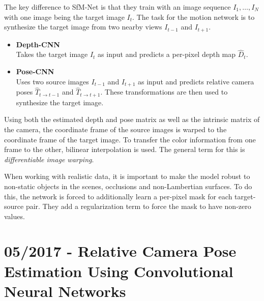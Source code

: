 		The key difference to SfM-Net is that they train with an image sequence $I_1, \dots, I_N$ with one image being the target image $I_t$.
		The task for the motion network is to synthesize the target image from two nearby views $I_{t - 1}$ and $I_{t + 1}$.
		\begin{itemize}
			\item \textbf{Depth-CNN}
				\\
				Takes the target image $I_t$ as input and predicts a per-pixel depth map $\hat{D}_t$.
			\item \textbf{Pose-CNN}
				\\
				Uses two source images $I_{t - 1}$ and $I_{t + 1}$ as input and predicts relative camera poses $\hat{T}_{t \rightarrow t - 1}$ and $\hat{T}_{t \rightarrow t + 1}$. 
				These transformations are then used to synthesize the target image.
		\end{itemize}
		Using both the estimated depth and pose matrix as well as the intrinsic matrix of the camera, the coordinate frame of the source images is warped to the coordinate frame of the target image.
		To transfer the color information from one frame to the other, bilinear interpolation is used.
		The general term for this is \emph{differentiable image warping}.
		
		When working with realistic data, it is important to make the model robust to non-static objects in the scenes, occlusions and non-Lambertian surfaces.
		To do this, the network is forced to additionally learn a per-pixel mask for each target-source pair.
		They add a regularization term to force the mask to have non-zero values.
		
	\section{05/2017 - Relative Camera Pose Estimation Using Convolutional Neural Networks}
	
